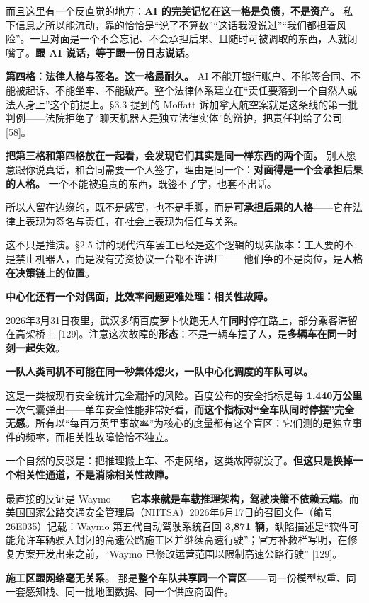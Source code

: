\documentclass[11pt,a4paper]{ctexart}
\begin{document}
而且这里有一个反直觉的地方：\textbf{AI 的完美记忆在这一格是负债，不是资产。} 私下信息之所以能流动，靠的恰恰是“说了不算数”“这话我没说过”“我们都担着风险”。一旦对面是一个不会忘记、不会承担后果、且随时可被调取的东西，人就闭嘴了。\textbf{跟 AI 说话，等于跟一份日志说话。}

\textbf{第四格：法律人格与签名。这一格最耐久。} AI 不能开银行账户、不能签合同、不能被起诉、不能坐牢、不能破产。整个法律体系建立在“责任要落到一个自然人或法人身上”这个前提上。\S{}3.3 提到的 Moffatt 诉加拿大航空案就是这条线的第一批判例——法院拒绝了“聊天机器人是独立法律实体”的辩护，把责任判给了公司 [58]。

\textbf{把第三格和第四格放在一起看，会发现它们其实是同一样东西的两个面。} 别人愿意跟你说真话，和合同需要一个人签字，理由是同一个：\textbf{对面得是一个会承担后果的人格。} 一个不能被追责的东西，既签不了字，也套不出话。

所以人留在边缘的，既不是感官，也不是手脚，而是\textbf{可承担后果的人格}——它在法律上表现为签名与责任，在社会上表现为信任与关系。

这不只是推演。\S{}2.5 讲的现代汽车罢工已经是这个逻辑的现实版本：工人要的不是禁止机器人，而是没有劳资协议一台都不许进厂——他们争的不是岗位，是\textbf{人格在决策链上的位置}。

\textbf{中心化还有一个对偶面，比效率问题更难处理：相关性故障。}

2026年3月31日夜里，武汉多辆百度萝卜快跑无人车\textbf{同时}停在路上，部分乘客滞留在高架桥上 [129]。注意这次故障的\textbf{形态}：不是一辆车撞了人，是\textbf{多辆车在同一时刻一起失效}。

\textbf{一队人类司机不可能在同一秒集体熄火，一队中心化调度的车队可以。}

这是一类被现有安全统计完全漏掉的风险。百度公布的安全指标是每 \textbf{1,440万公里}一次气囊弹出——单车安全性能非常好看，\textbf{而这个指标对“全车队同时停摆”完全无感}。所有以“每百万英里事故率”为核心的度量都有这个盲区：它们测的是独立事件的频率，而相关性故障恰恰不独立。

一个自然的反驳是：把推理搬上车、不走网络，这类故障就没了。\textbf{但这只是换掉一个相关性通道，不是消除相关性故障。}

最直接的反证是 Waymo——\textbf{它本来就是车载推理架构，驾驶决策不依赖云端}。而美国国家公路交通安全管理局（NHTSA）2026年6月17日的召回文件（编号 26E035）记载：Waymo 第五代自动驾驶系统召回 \textbf{3,871 辆}，缺陷描述是“软件可能允许车辆驶入封闭的高速公路施工区并继续高速行驶”；官方补救栏写明，在修复方案开发出来之前，“Waymo 已修改运营范围以限制高速公路行驶” [129]。

\textbf{施工区跟网络毫无关系。} 那是\textbf{整个车队共享同一个盲区}——同一份模型权重、同一套感知栈、同一批地图数据、同一个供应商固件。
\end{document}
